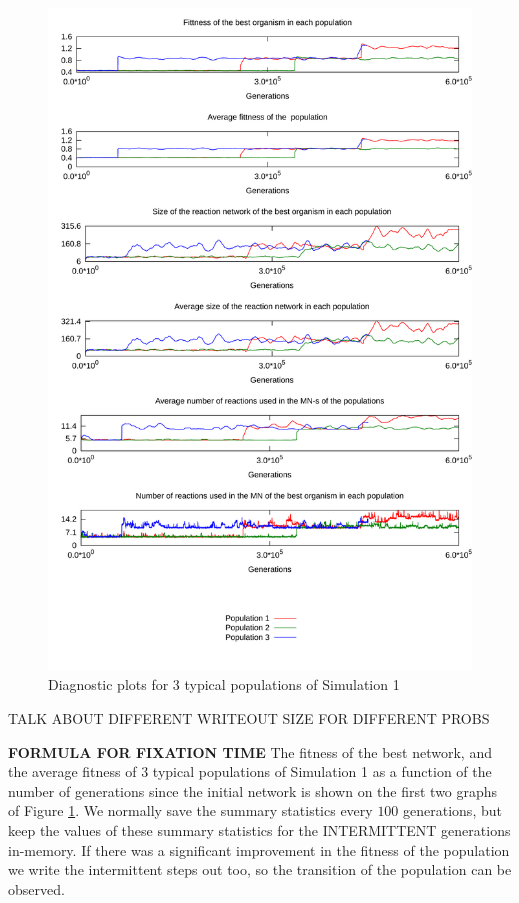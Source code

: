 \documentclass[10pt,a4paper]{article}
\begin{document}
\begin{figure}[htpb]
	\centering
	\includegraphics[width=1\linewidth]{simulation1.pdf}
	\caption{Diagnostic plots for 3 typical populations of Simulation 1}
	\label{fig:simulation1}
\end{figure}

TALK ABOUT DIFFERENT WRITEOUT SIZE FOR DIFFERENT PROBS

\textbf{FORMULA FOR FIXATION TIME}
The fitness of the best network, and the average fitness of $3$ typical populations of Simulation 1 as a function of the number of generations since the initial network is shown on the first two graphs of Figure \ref{fig:simulation1}. We normally save the summary statistics every $100$ generations, but keep the values of these summary statistics for the INTERMITTENT generations in-memory. If there was a significant improvement in the fitness of the population we write the intermittent steps out too, so the transition of the population can be observed. 
\end{document}
